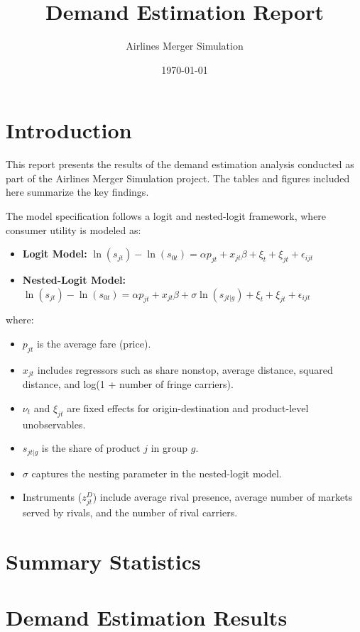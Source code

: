 \documentclass{article}
\title{Demand Estimation Report}
\author{Airlines Merger Simulation}
\date{\today}
\begin{document}
\maketitle

\section{Introduction}
This report presents the results of the demand estimation analysis conducted as part of the Airlines Merger Simulation project. The tables and figures included here summarize the key findings.

The model specification follows a logit and nested-logit framework, where consumer utility is modeled as:
\begin{itemize}
    \item \textbf{Logit Model:} $\ln(s_{jt}) - \ln(s_{0t}) = \alpha p_{jt} + x_{jt} \beta + \xi_t + \xi_{jt} + \epsilon_{ijt}$
    \item \textbf{Nested-Logit Model:} $\ln(s_{jt}) - \ln(s_{0t}) = \alpha p_{jt} + x_{jt} \beta + \sigma \ln(s_{jt|g}) + \xi_t + \xi_{jt} + \epsilon_{ijt}$
\end{itemize}
where:
\begin{itemize}
    \item $p_{jt}$ is the average fare (price).
    \item $x_{jt}$ includes regressors such as share nonstop, average distance, squared distance, and log(1 + number of fringe carriers).
    \item $\nu_t$ and $\xi_{jt}$ are fixed effects for origin-destination and product-level unobservables.
    \item $s_{jt|g}$ is the share of product $j$ in group $g$.
    \item $\sigma$ captures the nesting parameter in the nested-logit model.
    \item Instruments ($z^D_{jt}$) include average rival presence, average number of markets served by rivals, and the number of rival carriers.
\end{itemize}


\section{Summary Statistics}




\pagebreak
\section{Demand Estimation Results}
\end{document}

